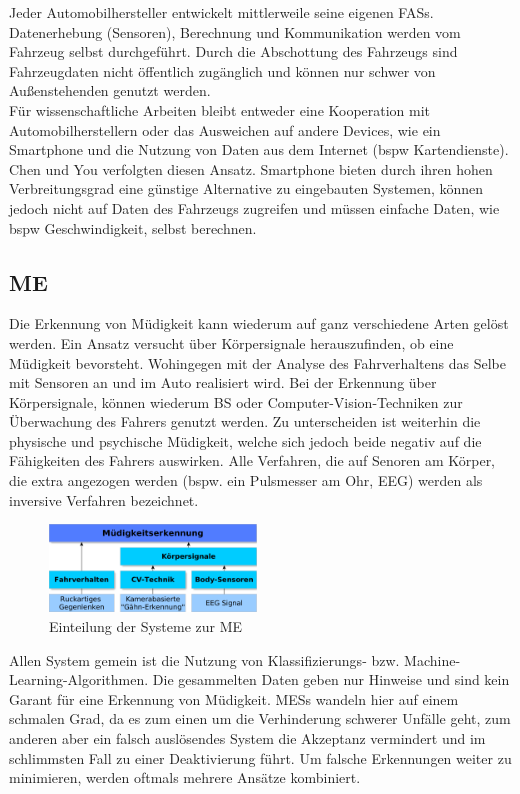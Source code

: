 {Jeder Automobilhersteller entwickelt mittlerweile seine eigenen \acl{FASs}. Datenerhebung (Sensoren), Berechnung und Kommunikation werden vom Fahrzeug selbst durchgeführt. Durch die Abschottung des Fahrzeugs sind Fahrzeugdaten nicht öffentlich zugänglich und können nur schwer von Außenstehenden genutzt werden. \\

Für wissenschaftliche Arbeiten bleibt entweder eine Kooperation mit Automobilherstellern oder das Ausweichen auf andere Devices, wie ein Smartphone und die Nutzung von Daten aus dem Internet (\acl{bspw} Kartendienste). Chen \cite{Chen:2015:ISV:2742647.2742659} und You \cite{You:2013:CAA:2462456.2465428} verfolgten diesen Ansatz. Smartphone bieten durch ihren hohen Verbreitungsgrad eine günstige Alternative zu eingebauten Systemen, können jedoch nicht auf Daten des Fahrzeugs zugreifen und müssen einfache Daten, wie \acl{bspw} Geschwindigkeit, selbst berechnen.

\subsection{\acl{ME}}
Die Erkennung von Müdigkeit kann wiederum auf ganz verschiedene Arten gelöst werden. Ein Ansatz versucht über Körpersignale herauszufinden, ob eine Müdigkeit bevorsteht. Wohingegen mit der Analyse des Fahrverhaltens das Selbe mit Sensoren an und im Auto realisiert wird.
Bei der Erkennung über Körpersignale, können wiederum \acl{BS} oder Computer-Vision-Techniken zur Überwachung des Fahrers genutzt werden. Zu unterscheiden ist weiterhin die physische und psychische Müdigkeit, welche sich jedoch beide negativ auf die Fähigkeiten des Fahrers auswirken. Alle Verfahren, die auf Senoren am Körper, die extra angezogen werden (bspw. ein Pulsmesser am Ohr, EEG) werden als inversive Verfahren bezeichnet. 

\begin{figure}[h] 
  \begin{center}
    \includegraphics[width=5.5cm]{img/ddd}
    \caption{Einteilung der Systeme zur \acl{ME}}
    \label{fig:block}
  \end{center}
\end{figure}

Allen System gemein ist die Nutzung von Klassifizierungs- bzw. Machine-Learning-Algorithmen. Die gesammelten Daten geben nur Hinweise und sind kein Garant für eine Erkennung von Müdigkeit. \acl{MESs} wandeln hier auf einem schmalen Grad, da es zum einen um die Verhinderung schwerer Unfälle geht, zum anderen aber ein falsch auslösendes System die Akzeptanz vermindert und im schlimmsten Fall zu einer Deaktivierung führt. Um falsche Erkennungen weiter zu minimieren, werden oftmals mehrere Ansätze kombiniert.\\

}
